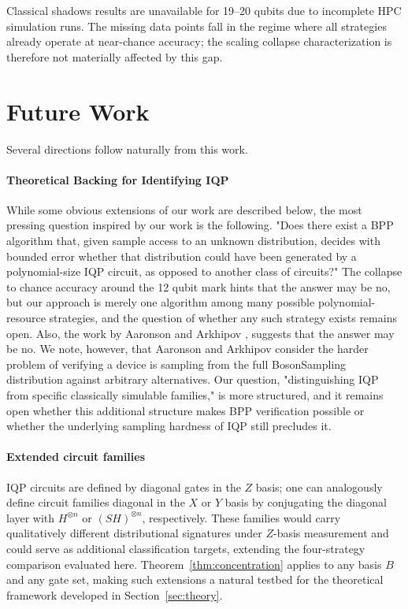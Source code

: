\documentclass[conference]{IEEEtran}
\newcommand{\nqubits}{n}
\begin{document}
Classical shadows results are unavailable for 19--20 qubits due to incomplete HPC simulation runs.
The missing data points fall in the regime where all strategies already operate at near-chance accuracy; the scaling collapse characterization is therefore not materially affected by this gap.

\section{Future Work}
\label{sec:future}

Several directions follow naturally from this work.

\paragraph{Theoretical Backing for Identifying IQP}
While some obvious extensions of our work are described below, the most pressing question inspired by our work is the following. 
"Does there exist a BPP algorithm that, given sample access to an unknown distribution, decides with bounded error whether that distribution could have been generated 
by a polynomial-size IQP circuit, as opposed to another class of circuits?" The collapse to chance accuracy around the 12 qubit mark hints 
that the answer may be no, but our approach is merely one algorithm among many possible polynomial-resource strategies, and the question of whether any 
such strategy exists remains open. Also, the work by Aaronson and Arkhipov \cite{aaronson2011computational}, suggests that the answer may be no. We note, however, 
that Aaronson and Arkhipov consider the harder problem of verifying a device is sampling from the full BosonSampling distribution against arbitrary alternatives. 
Our question, "distinguishing IQP from specific classically simulable families," is more structured, and it remains open whether this additional structure 
makes BPP verification possible or whether the underlying sampling hardness of IQP still precludes it.


\paragraph{Extended circuit families}
IQP circuits are defined by diagonal gates in the $Z$ basis; one can analogously define circuit families diagonal in the $X$ or $Y$ basis by conjugating the diagonal layer with $H^{\otimes \nqubits}$ or $(SH)^{\otimes \nqubits}$, respectively.
These families would carry qualitatively different distributional signatures under $Z$-basis measurement and could serve as additional classification targets, extending the four-strategy comparison evaluated here.
Theorem~\ref{thm:concentration} applies to any basis $B$ and any gate set, making such extensions a natural testbed for the theoretical framework developed in Section~\ref{sec:theory}.
\end{document}
